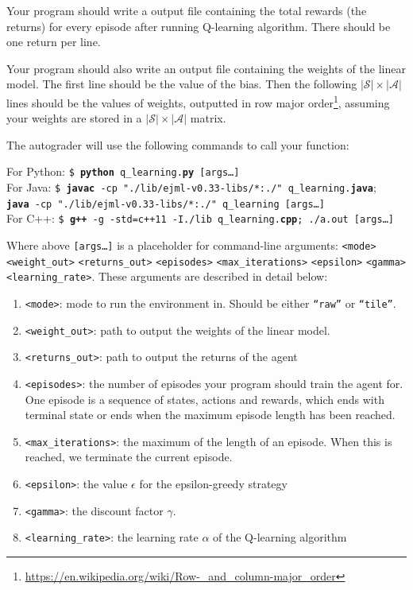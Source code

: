 \documentclass[11pt]{article}
\numberwithin{equation}{section} %
\numberwithin{figure}{section} %
\numberwithin{table}{section} %
\begin{document}
Your program should write a output file containing the total rewards (the returns) for every episode after running Q-learning algorithm. There should be one return per line.

Your program should also write an output file containing the weights of the linear model. The first line should be the value of the bias. Then the following $|\mathcal{S}| \times |\mathcal{A}|$ lines should be the values of weights, outputted in row major order\footnote{\url{https://en.wikipedia.org/wiki/Row-_and_column-major_order}}, assuming your weights are stored in a $|\mathcal{S}| \times |\mathcal{A}|$ matrix.

The autograder will use the following commands to call your function:

\begin{tabbing}
For Python: \=\texttt{\$ \textbf{python} q\_learning.\textbf{py} [args\dots]}\\
For Java: \>\texttt{\$ \textbf{javac} -cp "./lib/ejml-v0.33-libs/*:./" q\_learning.\textbf{java}};\\ \>  \texttt{\textbf{java} -cp "./lib/ejml-v0.33-libs/*:./" q\_learning [args\dots]}\\
For C++: \>\texttt{\$ \textbf{g++} -g -std=c++11 -I./lib q\_learning.\textbf{cpp}; ./a.out [args\dots]}\\
\end{tabbing}

Where above \texttt{[args\dots]} is a placeholder for command-line arguments: \texttt{<mode>} \texttt{<weight\_out>} \texttt{<returns\_out>} \texttt{<episodes>} \texttt{<max\_iterations>} \texttt{<epsilon>} \texttt{<gamma>} \texttt{<learning\_rate>}. These arguments are described in detail below:
\begin{enumerate}
    \item \texttt{<mode>}: mode to run the environment in. Should be either \texttt{``raw''} or \texttt{``tile''}.
    \item \texttt{<weight\_out>}: path to output the weights of the linear model.
    \item \texttt{<returns\_out>}: path to output the returns of the agent
    \item \texttt{<episodes>}: the number of episodes your program should train the agent for. One episode is a sequence of states, actions and rewards, which ends with terminal state or ends when the maximum episode length has been reached.
    \item \texttt{<max\_iterations>}: the maximum of the length of an episode. When this is reached, we terminate the current episode.
    \item \texttt{<epsilon>}: the value $\epsilon$ for the epsilon-greedy strategy
    \item \texttt{<gamma>}: the discount factor $\gamma$.
    \item \texttt{<learning\_rate>}: the learning rate $\alpha$ of the Q-learning algorithm
\end{enumerate}
\end{document}
